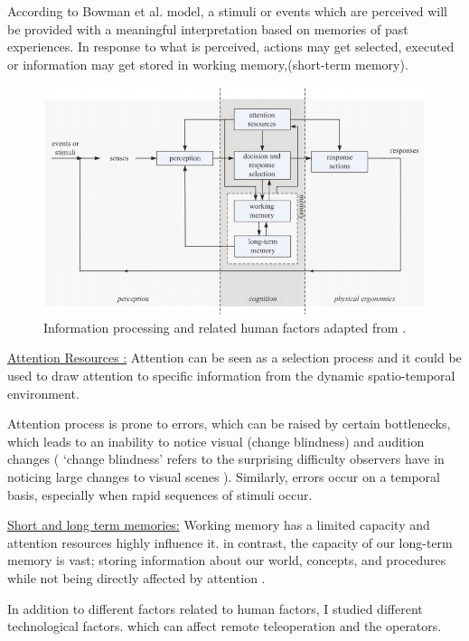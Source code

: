 According to Bowman et al. \cite{Bowman:2004:UIT:993837} model, a stimuli or events which are perceived will be provided with a meaningful interpretation based on memories of past experiences. In response to what is perceived, actions may get selected, executed or information may get stored in working memory,(short-term memory).

\begin{figure}
     \includegraphics[width=1\textwidth]{images/Info_proc.png}
    \caption{Information processing and related human factors adapted from \cite{PMID:11540969}.}
    \centering
    \label{Info Processing}
\end{figure}


\underline { Attention Resources :} Attention can be seen as a selection process and it could be used to draw attention to specific information from the dynamic spatio-temporal environment.

Attention process is prone to errors, which can be raised by certain bottlenecks, which leads to an inability to notice visual (change blindness) and audition changes ( ‘change blindness’ refers to the surprising difficulty observers have in noticing large changes to visual scenes \cite{SIMONS200516}). Similarly, errors occur on a temporal basis, especially when rapid sequences of stimuli occur.

\underline {Short and long term memories:} 
Working memory has a limited capacity and attention resources highly influence it. in contrast, the capacity of our long-term memory is vast; storing information about our world, concepts, and procedures while not being directly affected by attention \cite{Bowman:2004:UIT:993837}.

In addition to different factors related to human factors, I studied different technological factors. which can affect remote teleoperation and the operators. 


